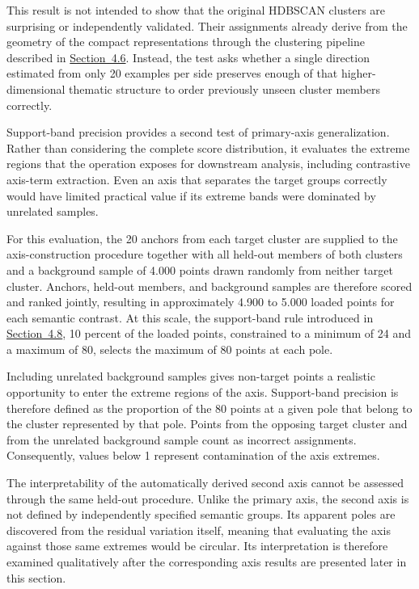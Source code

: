 This result is not intended to show that the original HDBSCAN clusters are surprising or independently validated. Their assignments already derive from the geometry of the compact representations through the clustering pipeline described in \hyperref[sec:4.6]{Section~4.6}. Instead, the test asks whether a single direction estimated from only 20 examples per side preserves enough of that higher-dimensional thematic structure to order previously unseen cluster members correctly.

Support-band precision provides a second test of primary-axis generalization. Rather than considering the complete score distribution, it evaluates the extreme regions that the operation exposes for downstream analysis, including contrastive axis-term extraction. Even an axis that separates the target groups correctly would have limited practical value if its extreme bands were dominated by unrelated samples.

For this evaluation, the 20 anchors from each target cluster are supplied to the axis-construction procedure together with all held-out members of both clusters and a background sample of 4.000 points drawn randomly from neither target cluster. Anchors, held-out members, and background samples are therefore scored and ranked jointly, resulting in approximately 4.900 to 5.000 loaded points for each semantic contrast. At this scale, the support-band rule introduced in \hyperref[sec:4.8]{Section~4.8}, 10 percent of the loaded points, constrained to a minimum of 24 and a maximum of 80, selects the maximum of 80 points at each pole.

Including unrelated background samples gives non-target points a realistic opportunity to enter the extreme regions of the axis. Support-band precision is therefore defined as the proportion of the 80 points at a given pole that belong to the cluster represented by that pole. Points from the opposing target cluster and from the unrelated background sample count as incorrect assignments. Consequently, values below 1 represent contamination of the axis extremes.

The interpretability of the automatically derived second axis cannot be assessed through the same held-out procedure. Unlike the primary axis, the second axis is not defined by independently specified semantic groups. Its apparent poles are discovered from the residual variation itself, meaning that evaluating the axis against those same extremes would be circular. Its interpretation is therefore examined qualitatively after the corresponding axis results are presented later in this section.

